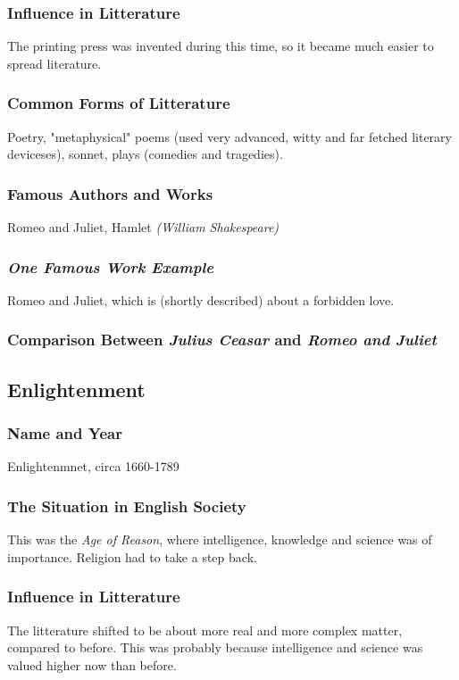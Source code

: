 \subsubsection{Influence in Litterature}
The printing press was invented during this time, so it became much easier to spread literature.

\subsubsection{Common Forms of Litterature}
Poetry, "metaphysical" poems (used very advanced, witty and far fetched literary deviceses), sonnet, plays (comedies and tragedies).

\subsubsection{Famous Authors and Works}
Romeo and Juliet, Hamlet \textit{(William Shakespeare)}

\subsubsection{\textit{One Famous Work Example}}
Romeo and Juliet, which is (shortly described) about a forbidden love.

\subsubsection{Comparison Between \textit{Julius Ceasar} and \textit{Romeo and Juliet}}

\newpage
\subsection{Enlightenment}

\subsubsection{Name and Year}
Enlightenmnet, circa 1660-1789

\subsubsection{The Situation in English Society}
This was the \textit{Age of Reason}, where intelligence, knowledge and science was of importance. Religion had to take a step back.

\subsubsection{Influence in Litterature}
The litterature shifted to be about more real and more complex matter, compared to before. This was probably because intelligence and science was valued higher now than before.

